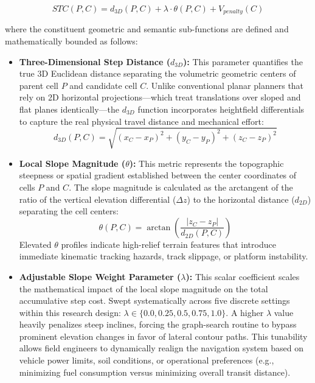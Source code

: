 \begin{equation}
    STC(P, C) = d_{3D}(P, C) + \lambda \cdot \theta(P, C) + V_{penalty}(C)
\end{equation}

\noindent where the constituent geometric and semantic sub-functions are defined and mathematically bounded as follows:

\begin{itemize}
    \item \textbf{Three-Dimensional Step Distance ($d_{3D}$):} This parameter quantifies the true 3D Euclidean distance separating the volumetric geometric centers of parent cell $P$ and candidate cell $C$. Unlike conventional planar planners that rely on 2D horizontal projections---which treat translations over sloped and flat planes identically---the $d_{3D}$ function incorporates heightfield differentials to capture the real physical travel distance and mechanical effort:
    \begin{equation}
        d_{3D}(P, C) = \sqrt{(x_C - x_P)^2 + (y_C - y_P)^2 + (z_C - z_P)^2}
    \end{equation}

    \item \textbf{Local Slope Magnitude ($\theta$):} This metric represents the topographic steepness or spatial gradient established between the center coordinates of cells $P$ and $C$. The slope magnitude is calculated as the arctangent of the ratio of the vertical elevation differential ($\Delta z$) to the horizontal distance ($d_{2D}$) separating the cell centers:
    \begin{equation}
        \theta(P, C) = \arctan\left(\frac{|z_C - z_P|}{d_{2D}(P, C)}\right)
    \end{equation}
    Elevated $\theta$ profiles indicate high-relief terrain features that introduce immediate
kinematic tracking hazards, track slippage, or platform instability.

    \item \textbf{Adjustable Slope Weight Parameter ($\lambda$):} This scalar coefficient scales the mathematical impact of the local slope magnitude on the total accumulative step cost. Swept systematically across five discrete settings within this research design: $\lambda \in \{0.0, \allowbreak 0.25, \allowbreak 0.5, \allowbreak 0.75, \allowbreak 1.0\}$. A higher $\lambda$ value heavily penalizes steep inclines, forcing the graph-search routine to bypass prominent elevation changes in favor of lateral contour paths. This tunability allows field engineers to dynamically realign the navigation system based on vehicle power limits, soil conditions, or operational preferences (e.g., minimizing fuel consumption versus minimizing overall transit distance).


\end{itemize}
